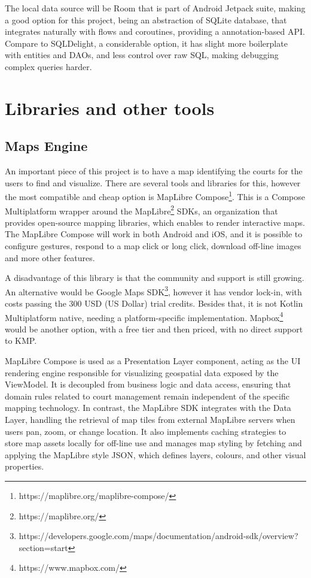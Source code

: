 The local data source will be Room\cite{room} that is part of Android Jetpack suite, making a good option for this project, being an abstraction of SQLite database, that integrates naturally with flows and coroutines, providing a annotation-based API. Compare to SQLDelight, a considerable option, it has slight more boilerplate with entities and DAOs, and less control over raw SQL, making debugging complex queries harder. 





\section{Libraries and other tools}


\subsection{Maps Engine}

An important piece of this project is to have a map identifying the courts for the users to find and visualize. There are several tools and libraries for this, however the most compatible and cheap option is MapLibre Compose\footnote{https://maplibre.org/maplibre-compose/}. This is a Compose Multiplatform wrapper around the MapLibre\footnote{https://maplibre.org/} SDKs, an organization that provides open-source mapping libraries, which enables to render interactive maps. The MapLibre Compose will work in both Android and iOS, and it is possible to configure gestures, respond to a map click or long click, download off-line images and more other features.

A disadvantage of this library is that the community and support is still growing. An alternative would be Google Maps SDK\footnote{https://developers.google.com/maps/documentation/android-sdk/overview?section=start}, however it has vendor lock-in, with costs passing the 300 USD (US Dollar) trial credits. Besides that, it is not Kotlin Multiplatform native, needing a platform-specific implementation. Mapbox\footnote{https://www.mapbox.com/} would be another option, with a free tier and then priced, with no direct support to KMP.

MapLibre Compose is used as a Presentation Layer component, acting as the UI rendering engine responsible for visualizing geospatial data exposed by the ViewModel. It is decoupled from business logic and data access, ensuring that domain rules related to court management remain independent of the specific mapping technology. In contrast, the MapLibre SDK integrates with the Data Layer, handling the retrieval of map tiles from external MapLibre servers when users pan, zoom, or change location. It also implements caching strategies to store map assets locally for off-line use and manages map styling by fetching and applying the MapLibre style JSON, which defines layers, colours, and other visual properties.

